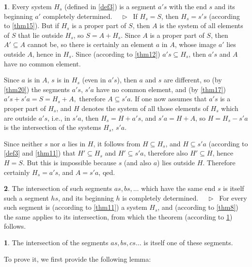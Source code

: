 \documentclass[leqno,hidelinks,10pt]{article}
\theoremstyle{definition}
\newtheorem{satz}{\protect\satzname}
\newtheorem*{zusatz}{\protect\zusatzname}
\newcommand{\satzname}{}
\newcommand{\zusatzname}{}
\renewcommand{\satzname}{\hspace{-4pt}.\ Satz}%
\renewcommand{\zusatzname}{Zusatz}%
\renewcommand{\satzname}{\hspace{-4pt}.\ Theorem}%
\renewcommand{\zusatzname}{Corollary}%
\newcommand\Beweis{\medskip \newline $ \phantom{'.'} \rhd \ $}%
\newcommand{\partof}{\subseteq}
\newcommand{\sref}[1]{\underline{\ref{#1}}}%
\begin{document}
\begin{paracol}{2}
\begin{rightcolumn}
\begin{satz}\label{thm27}
Every system $H_s$ (defined in \sref{def3}) is a segment $a's$ with the end $s$
and its beginning $a'$ completely determined.
\Beweis
If $H_s= S$, then $H_s= s's$ (according to \sref{thm15}).
But if $H_s$ is a proper part of $S$, then $A$ is the system of all elements
of $S$ that lie outside $H_s$, so $S=A+H_s$. Since $A$ is a proper part of $S$,
then $A' \partof A$ cannot be, so there is certainly an element $a$ in $A$, whose
image $a'$ lies outside $A$, hence in $H_s$. Since (according to \sref{thm12})
$a's \partof H_s$, then $a's$ and $A$ have no common element.

Since $a$ is in $A$, $s$ is in $H_s$ (even in $a's$), then $a$ and $s$ are
different, so (by \sref{thm20}) the segments $a's$, $s'a$ have no common element,
and (by \sref{thm17}) $a's+  s'a=S=H_s+ A,$ therefore $A \partof s'a$.
If one now assumes that $a's$ is a proper part of $H_s$, and $H$ denotes the
system of all those elements of $H_s$ which are outside $a's$, i.e., in $s'a$,
then $H_s = H+a's$, and $s'a = H + A$, so $H=H_s-s'a$ is the intersection of the
systems $H_s$, $s'a$.

Since neither $s$ nor $a$ lies in $H$, it follows from $H \partof H_s$, and
$H \partof s'a$ (according to \sref{def3} and \sref{thm11}) that $H' \partof H_s$
and $H' \partof s'a$, therefore also $H' \partof H$, hence $H = S$. But this is
impossible because $s$ (and also $a$) lies outside $H$. Therefore certainly
$H_s = a's$, and $A = s'a$, qed.
\end{satz}


\begin{satz}\label{thm28}
The intersection of such segments $as, bs, \ldots$ which have the same end $s$ is
itself such a segment $hs$, and its beginning $h$ is completely determined.
\Beweis
For every such segment is (according to \sref{thm11}) a system $H_s$, and
(according to \sref{thm8}) the same applies to its intersection, from which the
theorem (according to \sref{thm27}) follows.
\end{satz}

\begin{zusatz} \label{cor_to_thm28}
The intersection of the segments $as, bs, cs \ldots$ is itself one of these segments.
\end{zusatz}

To prove it, we first provide the following lemma:


\end{rightcolumn}
\end{paracol}
\end{document}
